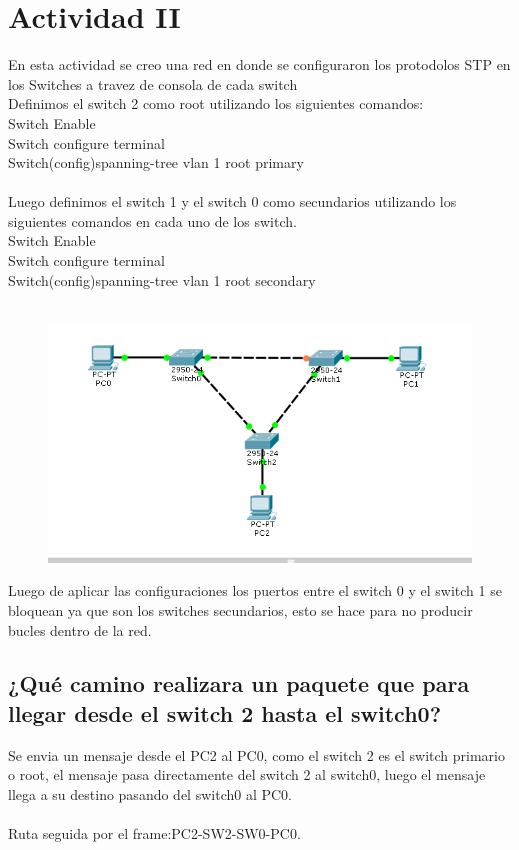\documentclass[spanish]{udpreport}
\begin{document}
\vspace{0.5cm}
\section{Actividad II}
En esta actividad se creo una red en donde se configuraron los protodolos STP en los Switches a travez de consola de cada switch\\
Definimos el switch 2 como root utilizando los siguientes comandos:\\
Switch Enable\\
Switch configure terminal\\
Switch(config)spanning-tree vlan 1 root primary\\\\

Luego definimos el switch 1 y el switch 0 como secundarios utilizando los siguientes comandos en cada uno de los switch.\\
Switch Enable\\
Switch configure terminal\\
Switch(config)spanning-tree vlan 1 root  secondary\\\\

\begin{figure}[H]
\begin{center}
\includegraphics[scale=0.7]{images/conSTP.PNG}
\end{center}
\end{figure}

Luego de aplicar las configuraciones los puertos entre el switch 0 y el switch 1 se bloquean ya que son los switches secundarios, esto se hace para no producir bucles dentro de la red.

\subsection{¿Qué camino realizara un paquete que para llegar desde el switch 2 hasta el switch0?}
Se envia un mensaje desde el PC2 al PC0, como el switch 2 es el switch primario o root, el mensaje pasa directamente del switch 2 al switch0, luego el mensaje llega a su destino pasando del switch0 al PC0.\\\\
Ruta seguida por el frame:PC2-SW2-SW0-PC0.
\end{document}
